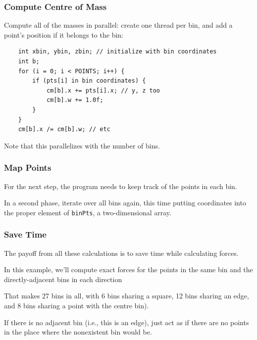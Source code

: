 \begin{frame}[fragile]
\frametitle{Compute Centre of Mass}

Compute all of the masses in parallel: create one thread per bin, and add a point's
position if it belongs to the bin:

\begin{lstlisting}
    int xbin, ybin, zbin; // initialize with bin coordinates
    int b;
    for (i = 0; i < POINTS; i++) {
        if (pts[i] in bin coordinates) {
            cm[b].x += pts[i].x; // y, z too
            cm[b].w += 1.0f;
        }
    }
    cm[b].x /= cm[b].w; // etc
\end{lstlisting}

Note that this parallelizes with the number of bins.


\end{frame}


\begin{frame}
\frametitle{Map Points}

For the next step, the program needs to keep track of the points in
each bin. 

 In a second phase,
iterate over all bins again, this time putting coordinates into the
proper element of {\tt binPts}, a two-dimensional array.

\end{frame}

\begin{frame}
\frametitle{Save Time}

The payoff from all these calculations is to save time while calculating forces. 

In this example, we'll compute exact forces for the points in the same bin and the directly-adjacent bins in each direction

That makes 27 bins in all, with 6 bins sharing a square, 12 bins sharing an edge, and 8 bins sharing a point with the centre bin). 

If there is no adjacent bin 
(i.e., this is an edge), just act as if there are no points 
in the place where the nonexistent bin would be. 

\end{frame}



